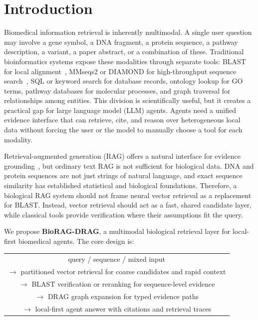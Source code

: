 \documentclass[11pt]{article}
\begin{document}
\section{Introduction}

Biomedical information retrieval is inherently multimodal. A single user question may involve a gene symbol, a DNA fragment, a protein sequence, a pathway description, a variant, a paper abstract, or a combination of these. Traditional bioinformatics systems expose these modalities through separate tools: BLAST for local alignment~\cite{altschul1990blast}, MMseqs2 or DIAMOND for high-throughput sequence search~\cite{steinegger2017mmseqs2,buchfink2021diamond}, SQL or keyword search for database records, ontology lookup for GO terms, pathway databases for molecular processes, and graph traversal for relationships among entities. This division is scientifically useful, but it creates a practical gap for large language model (LLM) agents. Agents need a unified evidence interface that can retrieve, cite, and reason over heterogeneous local data without forcing the user or the model to manually choose a tool for each modality.

Retrieval-augmented generation (RAG) offers a natural interface for evidence grounding~\cite{lewis2020rag}, but ordinary text RAG is not sufficient for biological data. DNA and protein sequences are not just strings of natural language, and exact sequence similarity has established statistical and biological foundations. Therefore, a biological RAG system should not frame neural vector retrieval as a replacement for BLAST. Instead, vector retrieval should act as a fast, shared candidate layer, while classical tools provide verification where their assumptions fit the query.

We propose \textbf{BioRAG-DRAG}, a multimodal biological retrieval layer for local-first biomedical agents. The core design is:

\begin{center}
\small
\begin{tabular}{c}
query / sequence / mixed input \\
$\rightarrow$ partitioned vector retrieval for coarse candidates and rapid context \\
$\rightarrow$ BLAST verification or reranking for sequence-level evidence \\
$\rightarrow$ DRAG graph expansion for typed evidence paths \\
$\rightarrow$ local-first agent answer with citations and retrieval traces
\end{tabular}
\end{center}
\end{document}
